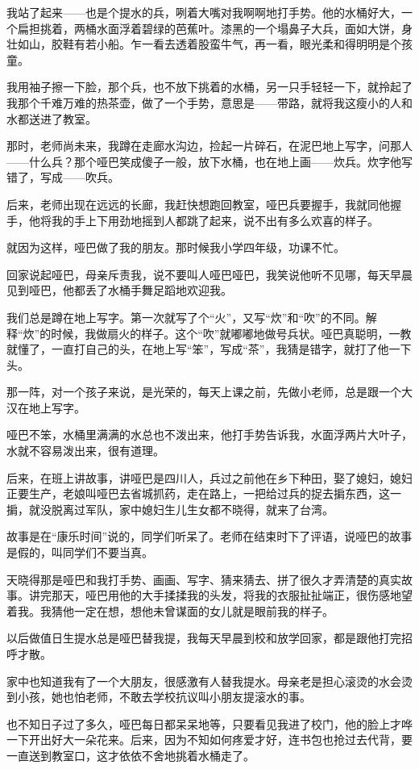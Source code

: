 \par 我站了起来——也是个提水的兵，咧着大嘴对我啊啊地打手势。他的水桶好大，一个扁担挑着，两桶水面浮着碧绿的芭蕉叶。漆黑的一个塌鼻子大兵，面如大饼，身壮如山，胶鞋有若小船。乍一看去透着股蛮牛气，再一看，眼光柔和得明明是个孩童。
\par 我用袖子擦一下脸，那个兵，也不放下挑着的水桶，另一只手轻轻一下，就拎起了我那个千难万难的热茶壶，做了一个手势，意思是——带路，就将我这瘦小的人和水都送进了教室。
\par 那时，老师尚未来，我蹲在走廊水沟边，捡起一片碎石，在泥巴地上写字，问那人——什么兵？那个哑巴笑成傻子一般，放下水桶，也在地上画——炊兵。炊字他写错了，写成——吹兵。
\par 后来，老师出现在远远的长廊，我赶快想跑回教室，哑巴兵要握手，我就同他握手，他将我的手上下用劲地摇到人都跳了起来，说不出有多么欢喜的样子。
\par 就因为这样，哑巴做了我的朋友。那时候我小学四年级，功课不忙。
\par 回家说起哑巴，母亲斥责我，说不要叫人哑巴哑巴，我笑说他听不见哪，每天早晨见到哑巴，他都丢了水桶手舞足蹈地欢迎我。
\par 我们总是蹲在地上写字。第一次就写了个“火”，又写“炊”和“吹”的不同。解释“炊”的时候，我做扇火的样子。这个“吹”就嘟嘟地做号兵状。哑巴真聪明，一教就懂了，一直打自己的头，在地上写“笨”，写成“茶”，我猜是错字，就打了他一下头。
\par 那一阵，对一个孩子来说，是光荣的，每天上课之前，先做小老师，总是跟一个大汉在地上写字。
\par 哑巴不笨，水桶里满满的水总也不泼出来，他打手势告诉我，水面浮两片大叶子，水就不容易泼出来，很有道理。
\par 后来，在班上讲故事，讲哑巴是四川人，兵过之前他在乡下种田，娶了媳妇，媳妇正要生产，老娘叫哑巴去省城抓药，走在路上，一把给过兵的捉去掮东西，这一掮，就没脱离过军队，家中媳妇生儿生女都不晓得，就来了台湾。
\par 故事是在“康乐时间”说的，同学们听呆了。老师在结束时下了评语，说哑巴的故事是假的，叫同学们不要当真。
\par 天晓得那是哑巴和我打手势、画画、写字、猜来猜去、拼了很久才弄清楚的真实故事。讲完那天，哑巴用他的大手揉揉我的头发，将我的衣服扯扯端正，很伤感地望着我。我猜他一定在想，想他未曾谋面的女儿就是眼前我的样子。
\par 以后做值日生提水总是哑巴替我提，我每天早晨到校和放学回家，都是跟他打完招呼才散。
\par 家中也知道我有了一个大朋友，很感激有人替我提水。母亲老是担心滚烫的水会烫到小孩，她也怕老师，不敢去学校抗议叫小朋友提滚水的事。
\par 也不知日子过了多久，哑巴每日都呆呆地等，只要看见我进了校门，他的脸上才哗一下开出好大一朵花来。后来，因为不知如何疼爱才好，连书包也抢过去代背，要一直送到教室口，这才依依不舍地挑着水桶走了。
